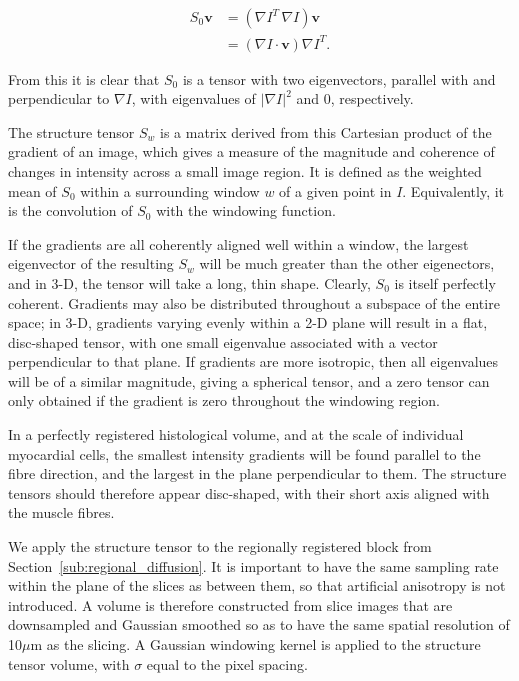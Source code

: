   \begin{align}
    S_0 \mathbf{v} &= (\nabla I^T \, \nabla I) \mathbf{v} \\
                   &= (\nabla I \cdot \mathbf{v}) \nabla I^T.
  \end{align}
  
  From this it is clear that $S_0$ is a tensor with two eigenvectors, parallel with and perpendicular to $\nabla I$, with eigenvalues of $|\nabla I|^2$ and 0, respectively.
  
  The structure tensor $S_w$ is a matrix derived from this Cartesian product of the gradient of an image, which gives a measure of the magnitude and coherence of changes in intensity across a small image region. It is defined as the weighted mean of $S_0$ within a surrounding window $w$ of a given point in $I$. Equivalently, it is the convolution of $S_0$ with the windowing function.
  
  If the gradients are all coherently aligned well within a window, the largest eigenvector of the resulting $S_w$ will be much greater than the other eigenectors, and in 3-D, the tensor will take a long, thin shape. Clearly, $S_0$ is itself perfectly coherent. Gradients may also be distributed throughout a subspace of the entire space; in 3-D, gradients varying evenly within a 2-D plane will result in a flat, disc-shaped tensor, with one small eigenvalue associated with a vector perpendicular to that plane. If gradients are more isotropic, then all eigenvalues will be of a similar magnitude, giving a spherical tensor, and a zero tensor can only obtained if the gradient is zero throughout the windowing region.
  
  In a perfectly registered histological volume, and at the scale of individual myocardial cells, the smallest intensity gradients will be found parallel to the fibre direction, and the largest in the plane perpendicular to them. The structure tensors should therefore appear disc-shaped, with their short axis aligned with the muscle fibres.
  
  We apply the structure tensor to the regionally registered block from Section~\ref{sub:regional_diffusion}. It is important to have the same sampling rate within the plane of the slices as between them, so that artificial anisotropy is not introduced. A volume is therefore constructed from slice images that are downsampled and Gaussian smoothed so as to have the same spatial resolution of 10$\mu$m as the slicing. A Gaussian windowing kernel is applied to the structure tensor volume, with $\sigma$ equal to the pixel spacing.

